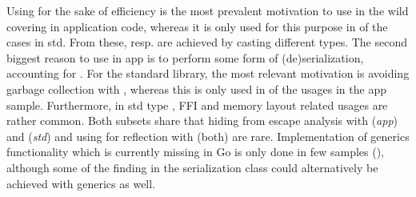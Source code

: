 
Using \unsafe{} for the sake of efficiency is the most prevalent motivation to use \unsafe{} in the wild covering  in application code, whereas it is only used for this purpose in  of the cases in std. 
From these,  resp.  are achieved by casting different types. 
The second biggest reason to use \unsafe{} in app is to perform some form of (de)serialization, accounting for .
For the standard library, the most relevant motivation is avoiding garbage collection with , whereas this is only used in  of the usages in the app sample.
Furthermore, in std type , FFI  and memory layout  related \unsafe{} usages are rather common.
Both subsets share that hiding from escape analysis with  (\textit{app}) and  (\textit{std}) and using \unsafe{} for reflection with  (both) are rare.
Implementation of generics functionality which is currently missing in Go is only done in few samples (), although some of the finding in the serialization class could alternatively be achieved with generics as well.


